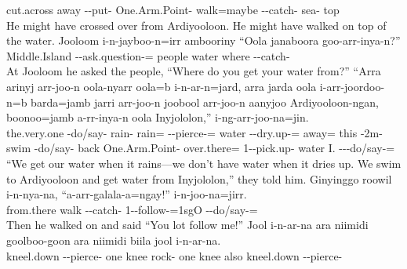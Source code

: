 \begin{exye}
cut.across away --put- One.Arm.Point- walk=maybe --catch- sea- top\\
\ft He might have crossed over from Ardiyooloon. He might have walked on top of the water.
\exy {}
\gll Jooloom i-n-jayboo-n=irr ambooriny ``Oola janaboora goo-arr-inya-n?''\\
Middle.Island --ask.question-= people water where --catch-\\
\ft At Jooloom he asked the people, ``Where do you get your water from?''
\exy {}
\gll ``Arra arinyj arr-joo-n oola-nyarr oola=b i-n-ar-n=jard, arra jarda oola i-arr-joordoo-n=b barda=jamb jarri arr-joo-n joobool arr-joo-n aanyjoo Ardiyooloon-ngan, boonoo=jamb a-rr-inya-n oola Inyjololon,''  i-ng-arr-joo-na=jin.\\
 the.very.one -do/say- rain- rain= --pierce-=   water --dry.up-= away= this -2m- swim -do/say- back One.Arm.Point- over.there= 1--pick.up- water I. ---do/say-=\\
\ft ``We get our water when it rains---we don't have water when it dries up. We swim to Ardiyooloon and get water from Inyjololon,'' they told him.
\exy {}%
\gll Ginyinggo roowil i-n-nya-na, ``a-arr-galala-a=ngay!'' i-n-joo-na=jirr.\\
from.there walk --catch- 1--follow-=1sgO --do/say-=\\
\ft Then he walked on and said ``You lot follow me!''
\exy {}
\gll Jool i-n-ar-na ara niimidi goolboo-goon ara niimidi biila jool i-n-ar-na.\\
kneel.down --pierce- one knee rock- one knee also kneel.down --pierce-\\

\end{exye}
